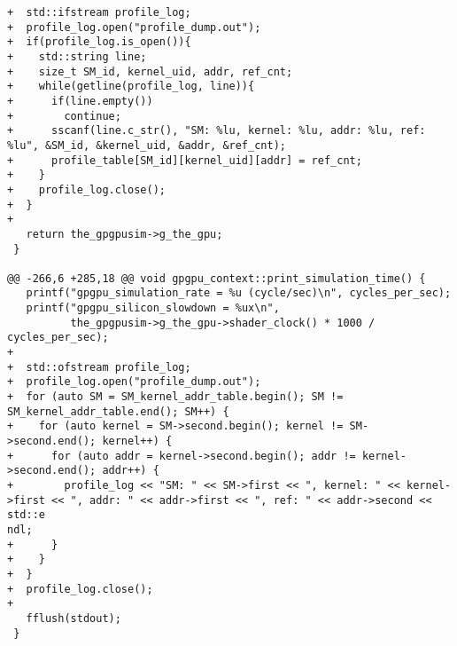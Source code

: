 \documentclass{article}
\begin{document}
\begin{verbatim}
+  std::ifstream profile_log;
+  profile_log.open("profile_dump.out");
+  if(profile_log.is_open()){
+    std::string line;
+    size_t SM_id, kernel_uid, addr, ref_cnt;
+    while(getline(profile_log, line)){
+      if(line.empty())
+        continue;
+      sscanf(line.c_str(), "SM: %lu, kernel: %lu, addr: %lu, ref: %lu", &SM_id, &kernel_uid, &addr, &ref_cnt);
+      profile_table[SM_id][kernel_uid][addr] = ref_cnt;
+    }
+    profile_log.close();
+  }
+
   return the_gpgpusim->g_the_gpu;
 }
 
@@ -266,6 +285,18 @@ void gpgpu_context::print_simulation_time() {
   printf("gpgpu_simulation_rate = %u (cycle/sec)\n", cycles_per_sec);
   printf("gpgpu_silicon_slowdown = %ux\n",
          the_gpgpusim->g_the_gpu->shader_clock() * 1000 / cycles_per_sec);
+
+  std::ofstream profile_log;
+  profile_log.open("profile_dump.out");
+  for (auto SM = SM_kernel_addr_table.begin(); SM != SM_kernel_addr_table.end(); SM++) {
+    for (auto kernel = SM->second.begin(); kernel != SM->second.end(); kernel++) {
+      for (auto addr = kernel->second.begin(); addr != kernel->second.end(); addr++) {
+        profile_log << "SM: " << SM->first << ", kernel: " << kernel->first << ", addr: " << addr->first << ", ref: " << addr->second << std::e
ndl;
+      }
+    }
+  }
+  profile_log.close();
+
   fflush(stdout);
 }
\end{verbatim}



\end{document}
